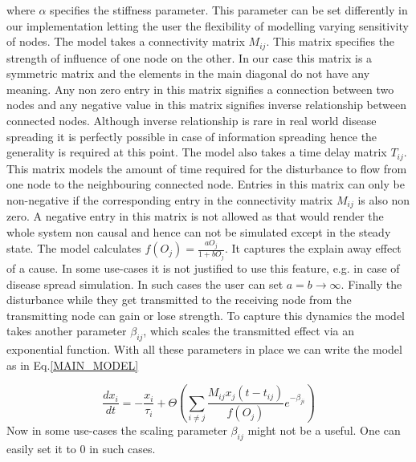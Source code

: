 \documentclass[11pt]{article}
\begin{document}
where $\alpha$ specifies the stiffness parameter. This parameter can be set differently in our implementation letting the user the flexibility of modelling varying sensitivity of nodes. The model takes a connectivity matrix $M_{ij}$. This matrix specifies the strength of influence of one node on the other. In our case this matrix is a symmetric matrix and the elements in the main diagonal do not have any meaning. Any non zero entry in this matrix signifies a connection between two nodes and any negative value in this matrix signifies inverse relationship between connected nodes. Although inverse relationship is rare in real world disease spreading it is perfectly possible in case of information spreading hence the generality is required at this point. The model also takes a time delay matrix $T_{ij}$. This matrix models the amount of time required for the disturbance to flow from one node to the neighbouring connected node. Entries in this matrix can only be non-negative if the corresponding entry in the connectivity matrix $M_{ij}$ is also non zero. A negative entry in this matrix is not allowed as that would render the whole system non causal and hence can not be simulated except in the steady state. The model calculates $f(O_j) = \frac{aO_j}{1+bO_j}$. It captures the explain away effect of a cause. In some use-cases it is not justified to use this feature, e.g. in case of disease spread simulation. In such cases the user can set $a=b\rightarrow\infty$. Finally the disturbance while they get transmitted to the receiving node from the transmitting node can gain or lose strength. To capture this dynamics the model takes another parameter $\beta_{ij}$, which scales the transmitted effect via an exponential function. With all these parameters in place we can write the model as in Eq.\ref{MAIN_MODEL}

\begin{equation}
\frac{dx_i}{dt} = -\frac{x_i}{\tau_i}+\Theta\left(\sum_{i\ne j}{\frac{M_{ij}x_j(t-t_{ij})}{f(O_j)}e^{-\beta_{ji}}}\right) 
\label{MAIN_MODEL}
\end{equation}
Now in some use-cases the scaling parameter $\beta_{ij}$ might not be a useful. One can easily set it to $0$ in such cases.
\end{document}
